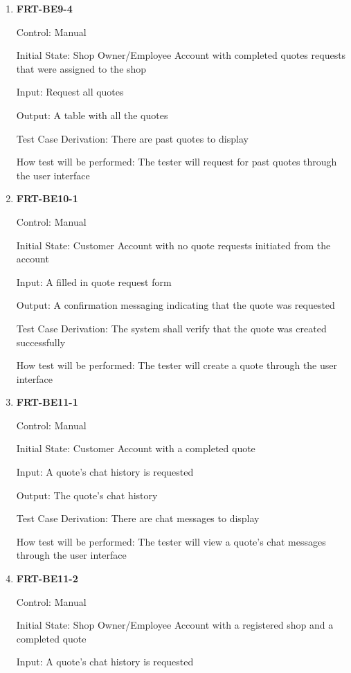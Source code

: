 \documentclass[12pt, titlepage]{article}
\begin{document}
\begin{enumerate}
	\item \textbf{FRT-BE9-4}

	      Control: Manual

	      Initial State: Shop Owner/Employee Account with completed quotes requests that were assigned to the
	      shop

	      Input: Request all quotes

	      Output: A table with all the quotes

	      Test Case Derivation: There are past quotes to display

	      How test will be performed: The tester will request for past quotes through the user interface

	\item \textbf{FRT-BE10-1}

	      Control: Manual

	      Initial State: Customer Account with no quote requests initiated from the account

	      Input: A filled in quote request form

	      Output: A confirmation messaging indicating that the quote was requested

	      Test Case Derivation: The system shall verify that the quote was created successfully

	      How test will be performed: The tester will create a quote through the user interface

	\item \textbf{FRT-BE11-1}

	      Control: Manual

	      Initial State: Customer Account with a completed quote

	      Input: A quote's chat history is requested

	      Output: The quote's chat history

	      Test Case Derivation: There are chat messages to display

	      How test will be performed: The tester will view a quote's chat messages through the user interface

	\item \textbf{FRT-BE11-2}

	      Control: Manual

	      Initial State: Shop Owner/Employee Account with a registered shop and a completed quote

	      Input: A quote's chat history is requested


\end{enumerate}
\end{document}
